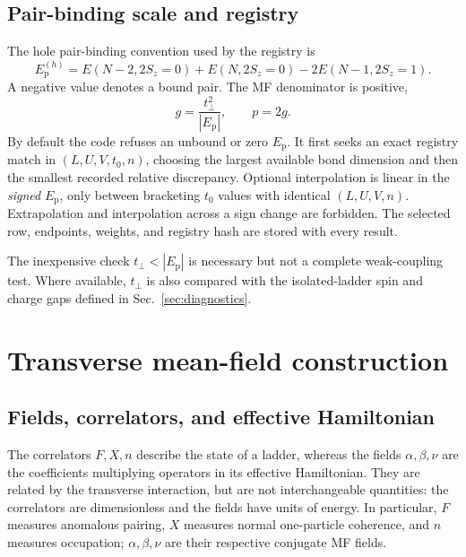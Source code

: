 \documentclass[11pt]{article}
\newcommand{\Ep}{E_{\mathrm p}}
\newcommand{\tp}{t_{\perp}}
\begin{document}
\subsection{Pair-binding scale and registry}

The hole pair-binding convention used by the registry is
\begin{equation}
 \Ep^{(h)}=E(N-2,2S_z=0)+E(N,2S_z=0)
             -2E(N-1,2S_z=1).
\label{eq:pair-binding}
\end{equation}
A negative value denotes a bound pair.  The MF denominator is positive,
\begin{equation}
  g=\frac{\tp^2}{|\Ep|}, \qquad p=2g.
\label{eq:g-definition}
\end{equation}
By default the code refuses an unbound or zero \(\Ep\).  It first seeks an
exact registry match in \((L,U,V,t_0,n)\), choosing the largest available bond
dimension and then the smallest recorded relative discrepancy.  Optional
interpolation is linear in the \emph{signed} \(\Ep\), only between bracketing
\(t_0\) values with identical \((L,U,V,n)\).  Extrapolation and interpolation
across a sign change are forbidden.  The selected row, endpoints, weights,
and registry hash are stored with every result.

The inexpensive check \(\tp<|\Ep|\) is necessary but not a complete
weak-coupling test.  Where available, \(\tp\) is also compared with the
isolated-ladder spin and charge gaps defined in Sec.~\ref{sec:diagnostics}.

\section{Transverse mean-field construction}
\label{sec:mean-field}

\subsection{Fields, correlators, and effective Hamiltonian}

The correlators \(F,X,n\) describe the state of a ladder, whereas the fields
\(\alpha,\beta,\nu\) are the coefficients multiplying operators in its
effective Hamiltonian.  They are related by the transverse interaction, but
are not interchangeable quantities: the correlators are dimensionless and
the fields have units of energy.  In particular, \(F\) measures anomalous
pairing, \(X\) measures normal one-particle coherence, and \(n\) measures
occupation; \(\alpha,\beta,\nu\) are their respective conjugate MF fields.
\end{document}
